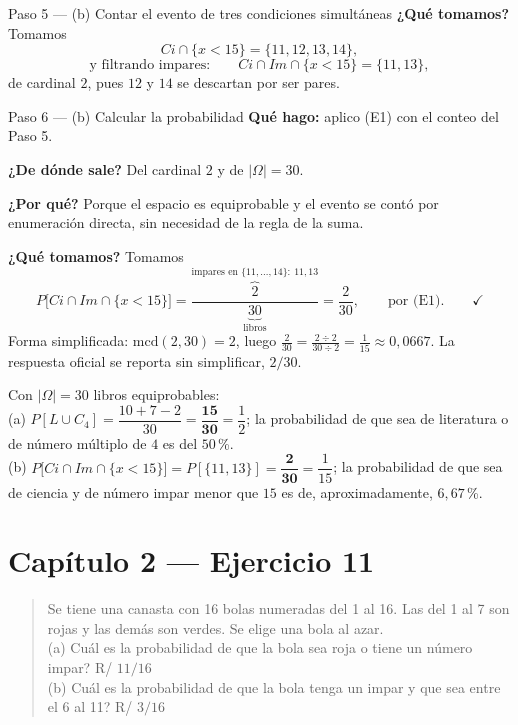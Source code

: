 \documentclass[11pt]{article}
\begin{document}
\begin{sol}
\begin{paso}{Paso 5 --- (b) Contar el evento de tres condiciones simultáneas}
\textbf{¿Qué tomamos?} Tomamos
\[
Ci\cap\{x<15\}=\{11,12,13,14\},
\]
\[
\text{y filtrando impares:}\qquad
Ci\cap Im\cap\{x<15\}=\{11,13\},
\]
de cardinal $2$, pues $12$ y $14$ se descartan por ser pares.
\end{paso}

\begin{paso}{Paso 6 --- (b) Calcular la probabilidad}
\textbf{Qué hago:} aplico (E1) con el conteo del Paso 5.

\textbf{¿De dónde sale?} Del cardinal $2$ y de $|\Omega|=30$.

\textbf{¿Por qué?} Porque el espacio es equiprobable y el evento se contó por enumeración
directa, sin necesidad de la regla de la suma.

\textbf{¿Qué tomamos?} Tomamos
\[
P\big[Ci\cap Im\cap\{x<15\}\big]
=\frac{\overbrace{2}^{\text{impares en }\{11,\dots,14\}:\ 11,13}}{\underbrace{30}_{\text{libros}}}
=\frac{2}{30} , \qquad\text{por (E1)} . \qquad\checkmark
\]
Forma simplificada: $\mathrm{mcd}(2,30)=2$, luego
$\frac{2}{30}=\frac{2\div 2}{30\div 2}=\frac{1}{15}\approx 0{,}0667$. La respuesta oficial se
reporta sin simplificar, $2/30$.
\end{paso}

\end{sol}

\begin{resp}
Con $|\Omega|=30$ libros equiprobables:\\[4pt]
(a) $P[L\cup C_4]=\dfrac{10+7-2}{30}=\mathbf{\dfrac{15}{30}}=\dfrac{1}{2}$; la probabilidad de que
sea de literatura o de número múltiplo de $4$ es del $50$\,\%.\\[4pt]
(b) $P\big[Ci\cap Im\cap\{x<15\}\big]=P[\{11,13\}]=\mathbf{\dfrac{2}{30}}=\dfrac{1}{15}$; la
probabilidad de que sea de ciencia y de número impar menor que $15$ es de, aproximadamente,
$6{,}67$\,\%.
\end{resp}

\section*{Capítulo 2 --- Ejercicio 11}

\begin{quote}
Se tiene una canasta con 16 bolas numeradas del 1 al 16. Las del 1 al 7 son rojas y las demás son
verdes. Se elige una bola al azar.\\
(a) Cuál es la probabilidad de que la bola sea roja o tiene un número impar? \hfill R/ $11/16$\\
(b) Cuál es la probabilidad de que la bola tenga un impar y que sea entre el 6 al 11? \hfill R/ $3/16$
\end{quote}
\end{document}
